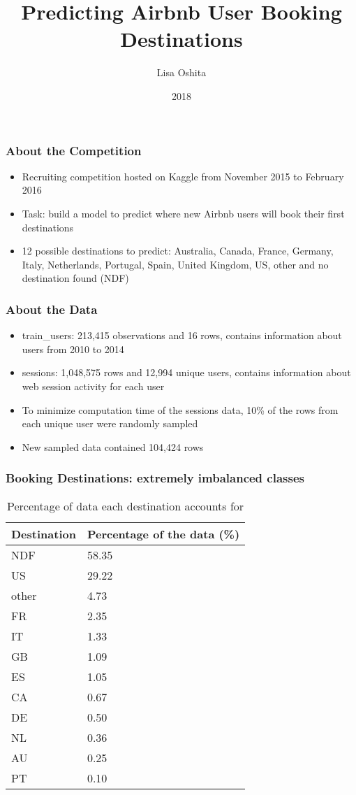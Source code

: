 \documentclass{beamer}
\title{Predicting Airbnb User Booking Destinations}
\author{Lisa Oshita}
\institute{California Polytechnic State University, San Luis Obispo}
\date{2018}
\begin{document}
 
\frame{\titlepage}

\begin{frame}
\frametitle{About the Competition}
  \begin{itemize}
    \item Recruiting competition hosted on Kaggle from November 2015 to February 2016
    \item Task: build a model to predict where new Airbnb users will book their first destinations
    \item 12 possible destinations to predict: Australia, Canada, France, Germany, Italy, Netherlands, Portugal, Spain, United Kingdom, US, other and no destination found (NDF)
  \end{itemize}
\end{frame}

\begin{frame}
\frametitle{About the Data}
\begin{itemize}
  \item train\_users: 213,415 observations and 16 rows, contains information about users from 2010 to 2014
  \item sessions: 1,048,575 rows and 12,994 unique users, contains information about web session activity for each user
  \item To minimize computation time of the sessions data, 10\% of the rows from each unique user were randomly sampled
  \item New sampled data contained 104,424 rows
\end{itemize}
\end{frame}

\begin{frame}
\frametitle{Booking Destinations: extremely imbalanced classes}
\begin{table}[ht]
\centering
\begin{tabular}{| l |l |}
  \hline
  \textbf{Destination} & \textbf{Percentage of the data (\%)} \\ 
  \hline
  NDF & 58.35 \\ 
  US & 29.22 \\ 
  other & 4.73 \\ 
  FR & 2.35 \\ 
  IT & 1.33 \\ 
  GB & 1.09 \\ 
  ES & 1.05 \\ 
  CA & 0.67 \\ 
  DE & 0.50 \\ 
  NL & 0.36 \\ 
  AU & 0.25 \\ 
  PT & 0.10 \\ 
   \hline
\end{tabular}
\caption{Percentage of data each destination accounts for}
\label{table:countries}
\end{table}
\end{frame}
\end{document}
